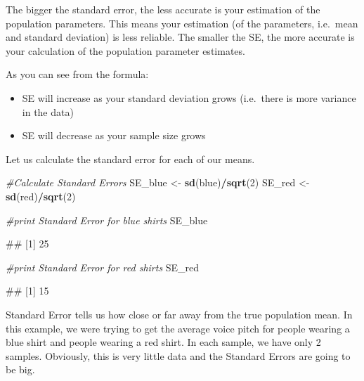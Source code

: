 \documentclass[
]{book}
\newenvironment{Shaded}{\begin{snugshade}}{\end{snugshade}}
\newcommand{\CommentTok}[1]{\textcolor[rgb]{0.56,0.35,0.01}{\textit{#1}}}
\newcommand{\DecValTok}[1]{\textcolor[rgb]{0.00,0.00,0.81}{#1}}
\newcommand{\FunctionTok}[1]{\textcolor[rgb]{0.13,0.29,0.53}{\textbf{#1}}}
\newcommand{\NormalTok}[1]{#1}
\newcommand{\OtherTok}[1]{\textcolor[rgb]{0.56,0.35,0.01}{#1}}
\newcommand{\SpecialCharTok}[1]{\textcolor[rgb]{0.81,0.36,0.00}{\textbf{#1}}}
\providecommand{\tightlist}{%
  \setlength{\itemsep}{0pt}\setlength{\parskip}{0pt}}
\begin{document}
The bigger the standard error, the less accurate is your estimation of the population parameters. This means your estimation (of the parameters, i.e.~mean and standard deviation) is less reliable. The smaller the SE, the more accurate is your calculation of the population parameter estimates.

As you can see from the formula:

\begin{itemize}
\tightlist
\item
  SE will increase as your standard deviation grows (i.e.~there is more variance in the data)
\item
  SE will decrease as your sample size grows
\end{itemize}

Let us calculate the standard error for each of our means.

\begin{Shaded}
\begin{Highlighting}[]
\CommentTok{\#Calculate Standard Errors}
\NormalTok{SE\_blue }\OtherTok{\textless{}{-}} \FunctionTok{sd}\NormalTok{(blue)}\SpecialCharTok{/}\FunctionTok{sqrt}\NormalTok{(}\DecValTok{2}\NormalTok{)}
\NormalTok{SE\_red }\OtherTok{\textless{}{-}} \FunctionTok{sd}\NormalTok{(red)}\SpecialCharTok{/}\FunctionTok{sqrt}\NormalTok{(}\DecValTok{2}\NormalTok{)}

\CommentTok{\#print Standard Error for blue shirts}
\NormalTok{SE\_blue}
\end{Highlighting}
\end{Shaded}

\begin{Shaded}
\begin{Highlighting}[]
\NormalTok{\#\# [1] 25}
\end{Highlighting}
\end{Shaded}

\begin{Shaded}
\begin{Highlighting}[]
\CommentTok{\#print Standard Error for red shirts}
\NormalTok{SE\_red}
\end{Highlighting}
\end{Shaded}

\begin{Shaded}
\begin{Highlighting}[]
\NormalTok{\#\# [1] 15}
\end{Highlighting}
\end{Shaded}

Standard Error tells us how close or far away from the true population mean. In this example, we were trying to get the average voice pitch for people wearing a blue shirt and people wearing a red shirt. In each sample, we have only 2 samples. Obviously, this is very little data and the Standard Errors are going to be big.
\end{document}
